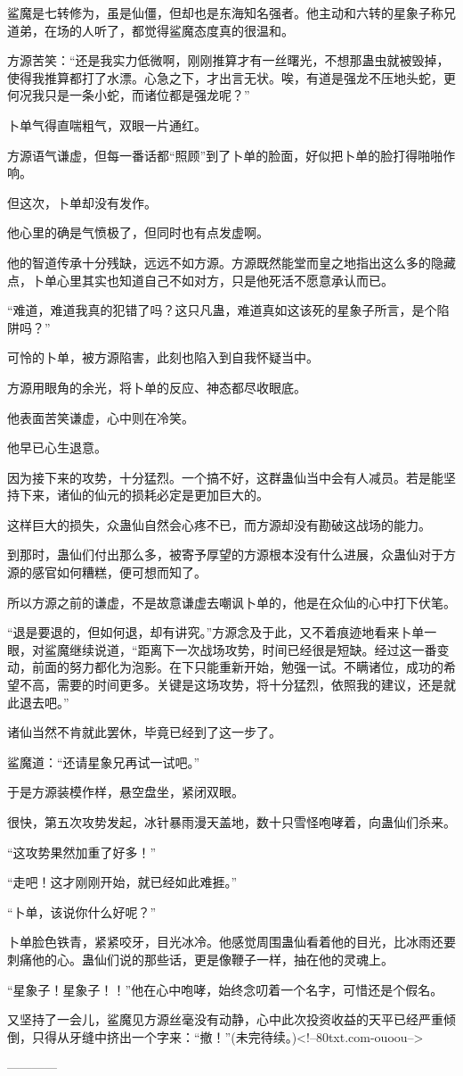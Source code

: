 \begin{this_body}
鲨魔是七转修为，虽是仙僵，但却也是东海知名强者。他主动和六转的星象子称兄道弟，在场的人听了，都觉得鲨魔态度真的很温和。

方源苦笑：“还是我实力低微啊，刚刚推算才有一丝曙光，不想那蛊虫就被毁掉，使得我推算都打了水漂。心急之下，才出言无状。唉，有道是强龙不压地头蛇，更何况我只是一条小蛇，而诸位都是强龙呢？”

卜单气得直喘粗气，双眼一片通红。

方源语气谦虚，但每一番话都“照顾”到了卜单的脸面，好似把卜单的脸打得啪啪作响。

但这次，卜单却没有发作。

他心里的确是气愤极了，但同时也有点发虚啊。

他的智道传承十分残缺，远远不如方源。方源既然能堂而皇之地指出这么多的隐藏点，卜单心里其实也知道自己不如对方，只是他死活不愿意承认而已。

“难道，难道我真的犯错了吗？这只凡蛊，难道真如这该死的星象子所言，是个陷阱吗？”

可怜的卜单，被方源陷害，此刻也陷入到自我怀疑当中。

方源用眼角的余光，将卜单的反应、神态都尽收眼底。

他表面苦笑谦虚，心中则在冷笑。

他早已心生退意。

因为接下来的攻势，十分猛烈。一个搞不好，这群蛊仙当中会有人减员。若是能坚持下来，诸仙的仙元的损耗必定是更加巨大的。

这样巨大的损失，众蛊仙自然会心疼不已，而方源却没有勘破这战场的能力。

到那时，蛊仙们付出那么多，被寄予厚望的方源根本没有什么进展，众蛊仙对于方源的感官如何糟糕，便可想而知了。

所以方源之前的谦虚，不是故意谦虚去嘲讽卜单的，他是在众仙的心中打下伏笔。

“退是要退的，但如何退，却有讲究。”方源念及于此，又不着痕迹地看来卜单一眼，对鲨魔继续说道，“距离下一次战场攻势，时间已经很是短缺。经过这一番变动，前面的努力都化为泡影。在下只能重新开始，勉强一试。不瞒诸位，成功的希望不高，需要的时间更多。关键是这场攻势，将十分猛烈，依照我的建议，还是就此退去吧。”

诸仙当然不肯就此罢休，毕竟已经到了这一步了。

鲨魔道：“还请星象兄再试一试吧。”

于是方源装模作样，悬空盘坐，紧闭双眼。

很快，第五次攻势发起，冰针暴雨漫天盖地，数十只雪怪咆哮着，向蛊仙们杀来。

“这攻势果然加重了好多！”

“走吧！这才刚刚开始，就已经如此难捱。”

“卜单，该说你什么好呢？”

卜单脸色铁青，紧紧咬牙，目光冰冷。他感觉周围蛊仙看着他的目光，比冰雨还要刺痛他的心。蛊仙们说的那些话，更是像鞭子一样，抽在他的灵魂上。

“星象子！星象子！！”他在心中咆哮，始终念叨着一个名字，可惜还是个假名。

又坚持了一会儿，鲨魔见方源丝毫没有动静，心中此次投资收益的天平已经严重倾倒，只得从牙缝中挤出一个字来：“撤！”(未完待续。)<!--80txt.com-ouoou-->

------------

\end{this_body}


